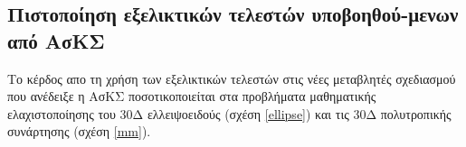 
\subsection{Πιστοποίηση εξελικτικών τελεστών υποβοηθού-μενων από ΑσΚΣ}
Το κέρδος απο τη χρήση των εξελικτικών τελεστών στις νέες μεταβλητές σχεδιασμού που ανέδειξε η ΑσΚΣ  ποσοτικοποιείται στα προβλήματα μαθηματικής ελαχιστοποίησης του 30Δ ελλειψοειδούς (σχέση \ref{ellipse}) και τις 30Δ πολυτροπικής συνάρτησης (σχέση \ref{mm}). 



